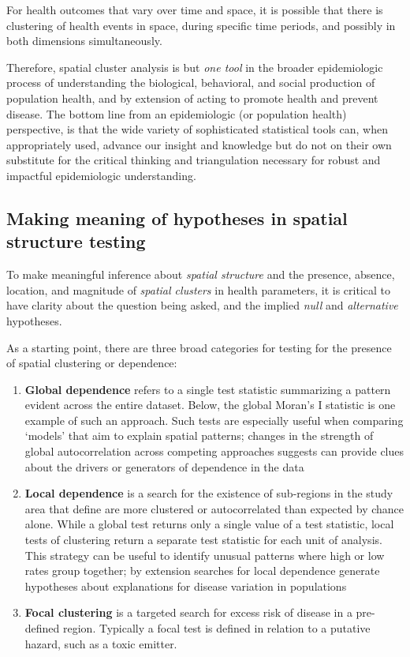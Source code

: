 \documentclass[
]{book}
\providecommand{\tightlist}{%
  \setlength{\itemsep}{0pt}\setlength{\parskip}{0pt}}
\begin{document}
For health outcomes that vary over time and space, it is possible that there is clustering of health events in space, during specific time periods, and possibly in both dimensions simultaneously.

Therefore, spatial cluster analysis is but \emph{one tool} in the broader epidemiologic process of understanding the biological, behavioral, and social production of population health, and by extension of acting to promote health and prevent disease. The bottom line from an epidemiologic (or population health) perspective, is that the wide variety of sophisticated statistical tools can, when appropriately used, advance our insight and knowledge but do not on their own substitute for the critical thinking and triangulation necessary for robust and impactful epidemiologic understanding.

\hypertarget{making-meaning-of-hypotheses-in-spatial-structure-testing}{%
\subsection{Making meaning of hypotheses in spatial structure testing}\label{making-meaning-of-hypotheses-in-spatial-structure-testing}}

To make meaningful inference about \emph{spatial structure} and the presence, absence, location, and magnitude of \emph{spatial clusters} in health parameters, it is critical to have clarity about the question being asked, and the implied \emph{null} and \emph{alternative} hypotheses.

As a starting point, there are three broad categories for testing for the presence of spatial clustering or dependence:

\begin{enumerate}
\def\labelenumi{\arabic{enumi}.}
\tightlist
\item
  \textbf{Global dependence} refers to a single test statistic summarizing a pattern evident across the entire dataset. Below, the global Moran's I statistic is one example of such an approach. Such tests are especially useful when comparing `models' that aim to explain spatial patterns; changes in the strength of global autocorrelation across competing approaches suggests can provide clues about the drivers or generators of dependence in the data
\item
  \textbf{Local dependence} is a search for the existence of sub-regions in the study area that define are more clustered or autocorrelated than expected by chance alone. While a global test returns only a single value of a test statistic, local tests of clustering return a separate test statistic for each unit of analysis. This strategy can be useful to identify unusual patterns where high or low rates group together; by extension searches for local dependence generate hypotheses about explanations for disease variation in populations
\item
  \textbf{Focal clustering} is a targeted search for excess risk of disease in a pre-defined region. Typically a focal test is defined in relation to a putative hazard, such as a toxic emitter.
\end{enumerate}
\end{document}
